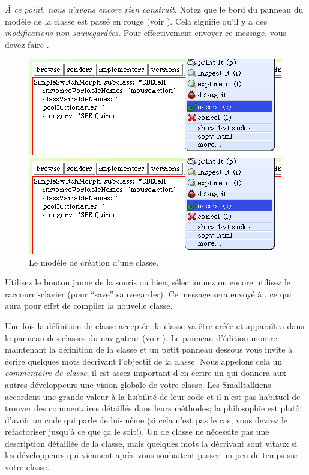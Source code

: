 \documentclass[a4paper,10pt,twoside]{book}
\begin{document}
\emph{À ce point, nous n'avons encore rien construit.}
Notez que le bord du panneau du modèle de la classe est passé en rouge
(voir ).
Cela signifie qu'il y a des \emph{modifications non sauvegardées}.
Pour effectivement envoyer ce message, vous devez faire .

\begin{figure}[h!t]
\ifluluelse
	{\centerline {\includegraphics[width=\textwidth]{AcceptClassDef}}}
	{\centerline {\includegraphics[scale=0.7]{AcceptClassDef}}}
\caption{Le modèle de création d'une classe.
\label{fig:acceptClassDef}}
\end{figure}

Utilisez le bouton jaune de la souris ou bien, sélectionnez
 ou encore utilisez le raccourci-clavier  (pour
``save'' 
\cad sauvegarder).
Ce message sera envoyé à , ce qui aura pour
effet de compiler la nouvelle classe.

Une fois la définition de classe acceptée, la classe va \^etre créée et
apparaîtra dans le panneau des classes du navigateur (voir ).
Le panneau d'édition montre maintenant la définition de la classe et
un petit panneau dessous vous invite à écrire quelques mots décrivant
l'objectif de la classe. Nous appelons cela un \emph{commentaire de
  classe}; il est assez important d'en écrire un qui donnera aux
autres développeurs une vision 
globale de votre classe.
Les Smalltalkiens accordent une grande valeur à la lisibilité de leur
code et il n'est pas habituel de trouver des commentaires détaillés
dans leurs méthodes; la philosophie est plutôt d'avoir un code qui
parle de lui-m\^eme (si cela n'est pas le cas, vous devrez le
refactoriser jusqu'à ce que \c{c}a le soit!). 
Un  de classe ne nécessite pas une
description détaillée de la classe, mais quelques mots la décrivant
sont vitaux si les développeurs qui viennent après vous souhaitent
passer un peu de temps sur votre classe.
\end{document}

